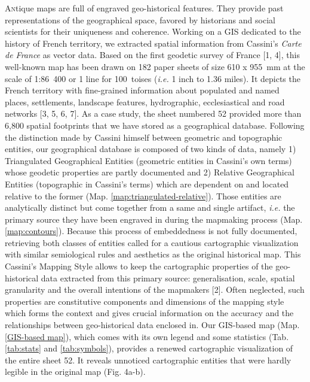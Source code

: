 \documentclass[portrait, A0]{sciposter}
\begin{document}
\begin{minipage}[b]{75cm}
\begin{multicols}{3}
\lettrine{A}ntique maps are full of engraved geo-historical features. They provide past representations of the geographical space, favored by historians and social scientists for their uniqueness and coherence. Working on a GIS dedicated to the history of French territory, we extracted spatial information from Cassini’s \textit{Carte de France} as vector data. Based on the first geodetic survey of France [1, 4], this well-known map has been drawn on 182 paper sheets of size 610 x 955~mm at the scale of 1:86~400 or 1 line for 100~toises (\textit{i.e.} 1 inch to 1.36 miles). It depicts the French territory with fine-grained information about populated and named places, settlements, landscape features, hydrographic, ecclesiastical and road networks [3, 5, 6, 7]. As a case study, the sheet numbered 52 provided more than 6,800 spatial footprints that we have stored as a geographical database. Following the distinction made by Cassini himself between \og geometric \fg and \og topographic \fg entities, our geographical database is composed of two kinds of data, namely 1) Triangulated Geographical Entities (\og geometric \fg entities in Cassini’s own terms) whose geodetic properties are partly documented and 2) Relative Geographical Entities (\og topographic \fg in Cassini’s terms) which are dependent on and located relative to the former (Map. \ref{map:triangulated-relative}). Those entities are analytically distinct but come together from a same and single artifact, \emph{i.e.} the primary source they have been engraved in during the mapmaking process (Map. \ref{map:contours}). Because this process of embeddedness is not fully documented, retrieving both classes of entities called for a cautious cartographic visualization with similar semiological rules and aesthetics as the original historical map. This \og Cassini's Mapping Style \fg allows to keep the cartographic properties of the geo-historical data extracted from this primary source: generalisation, scale, spatial granularity and the overall intentions of the mapmakers [2]. Often neglected, such properties are constitutive components and dimensions of the mapping style which forms the context and gives crucial information on the accuracy and the relationships between geo-historical data enclosed in. Our GIS-based map (Map. \ref{GIS-based map}),  which comes with its own legend and some statistics (Tab. \ref{tab:stats} and \ref{tab:symbols}), provides a renewed cartographic visualization of the entire sheet 52. It reveals unnoticed cartographic entities that were hardly legible in the original map (Fig. 4a-b).\\
\vfill



\end{multicols}
\end{minipage}
\end{document}
